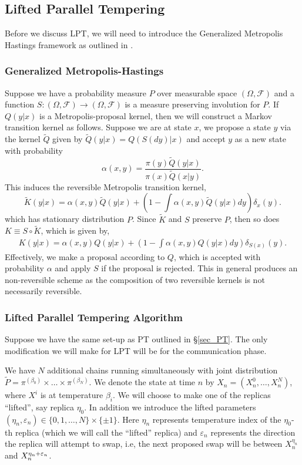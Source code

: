 \subsection{Lifted Parallel Tempering}
Before we discuss LPT, we will need to introduce the Generalized Metropolis Hastings framework as outlined in \cite{stoltz2010free}.
\subsubsection{Generalized Metropolis-Hastings}\label{sec_GMH}
Suppose we have a probability measure $P$ over measurable space $(\Omega,\mathcal{F})$ and a function $S:(\Omega,\mathcal{F})\to (\Omega,\mathcal{F})$ is a measure preserving involution for $P$. If $Q(y|x)$ is a Metropolis-proposal kernel, then we will construct a Markov transition kernel as follows. Suppose we are at state $x$, we propose a state $y$ via the kernel $\tilde{Q}$ given by $\tilde{Q}(y|x)=Q(S(dy)|x)$ and accept $y$ as a new state with probability 
\[\alpha(x,y)=\frac{\pi(y)\tilde{Q}(y|x)}{\pi(x)\tilde{Q}(x|y)}.\]
This induces the reversible Metropolis transition kernel, 
\[\tilde{K}(y|x)=\alpha(x,y)\tilde{Q}(y|x)+\left(1-\int\alpha(x,y)\tilde{Q}(y|x)dy\right)\delta_x(y).\]
which has stationary distribution $P$. Since $\tilde{K}$ and $S$ preserve $P$, then so does $K\equiv S\circ \tilde{K}$, which is given by,
\begin{align*}
K(y|x)=\alpha(x,y)Q(y|x)+\left(1-\int\alpha(x,y)Q(y|x)dy\right)\delta_{S(x)}(y).
\end{align*}
Effectively, we make a proposal according to $Q$, which is accepted with probability $\alpha$ and apply $S$ if the proposal is rejected. This in general produces an non-reversible scheme as the composition of two reversible kernels is not necessarily reversible.
\subsubsection{Lifted Parallel Tempering Algorithm}
Suppose we have the same set-up as PT outlined in \S\ref{sec_PT}. The only modification we will make for LPT will be for the communication phase.

We have $N$ additional chains running simultaneously with joint distribution $\tilde{P}=\pi^{(\beta_0)}\times\dots\times\pi^{(\beta_N)}$. We denote the state at time $n$ by $X_n=(X^0_n,\dots, X^N_n)$, where $X^i$ is at temperature $\beta_i$. We will choose to make one of the replicas ``lifted'', say replica $\eta_0$.  In addition we introduce the lifted parameters $(\eta_n,\varepsilon_n)\in \{0,1,\dots,N\}\times\{\pm 1\}$. Here $\eta_n$ represents temperature index of the $\eta_0$-th replica (which we will call the ``lifted'' replica) and $\varepsilon_n$ represents the direction the replica will attempt to swap, i.e, the next proposed swap will be between $X^{\eta_n}_n$ and $X^{\eta_n+\varepsilon_n}_n$. 

